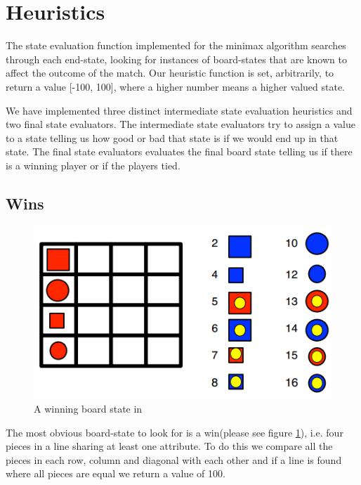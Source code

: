 \section{Heuristics}\label{heuristics}
The state evaluation function implemented for the minimax algorithm searches 
through each end-state, looking for instances of board-states that are known  
to affect the outcome of the match.
Our heuristic function is set, arbitrarily, to return a value [-100, 100], 
where a higher number means a higher valued state.

We have implemented three distinct intermediate state evaluation heuristics
and two final state evaluators. The intermediate state evaluators try to assign
a value to a state telling us how good or bad that state is if we would end up
in that state. The final state evaluators evaluates the final board state telling
us if there is a winning player or if the players tied.

\subsection{Wins}\label{win}
\begin{figure}[htb]
\includegraphics{pictures/win.png}
\caption[A \quarto{} win]{A winning board state in \quarto{}}
\label{fig:win}
\end{figure}
The most obvious board-state to look for is a win(please see figure \ref{fig:win}), 
i.e. four pieces in a line  
sharing at least one attribute. To do this we compare all the pieces in each 
row, column and diagonal with each other and if a line is found where all 
pieces are equal we return a value of 100.

